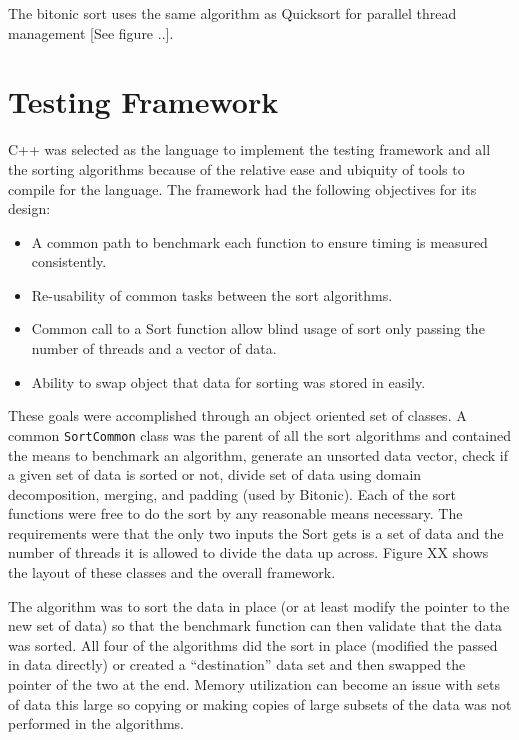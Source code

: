 \documentclass[journal]{IEEEtran}
\begin{document}
The bitonic sort uses the same algorithm as Quicksort for parallel thread management [See figure ..].

\section{Testing Framework}
\label{sec:testing}

C++ was selected as the language to implement the testing framework and all the sorting algorithms because of the relative ease and ubiquity of tools to compile for the language. The framework had the following objectives for its design:

\begin{itemize}
\item A common path to benchmark each function to ensure timing is measured consistently.
\item Re-usability of common tasks between the sort algorithms.
\item Common call to a Sort function allow blind usage of sort only passing the number of threads and a vector of data.
\item Ability to swap object that data for sorting was stored in easily.
\end{itemize}

These goals were accomplished through an object oriented set of classes. A common \texttt{SortCommon} class was the parent of all the sort algorithms and contained the means to benchmark an algorithm, generate an unsorted data vector, check if a given set of data is sorted or not, divide set of data using domain decomposition, merging, and padding (used by Bitonic). Each of the sort functions were free to do the sort by any reasonable means necessary. The requirements were that the only two inputs the Sort gets is a set of data and the number of threads it is allowed to divide the data up across. Figure XX shows the layout of these classes and the overall framework.

The algorithm was to sort the data in place (or at least modify the pointer to the new set of data) so that the benchmark function can then validate that the data was sorted. All four of the algorithms did the sort in place (modified the passed in data directly) or created a ``destination'' data set and then swapped the pointer of the two at the end. Memory utilization can become an issue with sets of data this large so copying or making copies of large subsets of the data was not performed in the algorithms.
\end{document}

